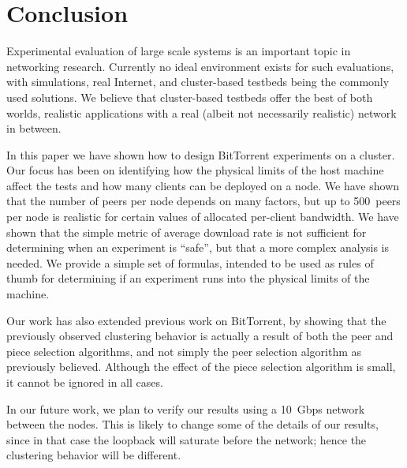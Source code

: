 \documentclass[10pt,letterpaper,twocolumn]{article}
\begin{document}
\section{Conclusion}
\label{conclusion}

Experimental evaluation of large scale systems is an important topic
in networking research. Currently no ideal environment exists for such
evaluations, with simulations, real Internet, and cluster-based
testbeds being the commonly used solutions. We believe that
cluster-based testbeds offer the best of both worlds, realistic
applications with a real (albeit not necessarily realistic) network in
between. 

In this paper we have shown how to design BitTorrent experiments on a
cluster. Our focus has been on identifying how the physical limits of
the host machine affect the tests and how many clients can be deployed
on a node. We have shown that the number of peers per node depends on
many factors, but up to 500~peers per node is realistic for certain
values of allocated per-client bandwidth. We have shown that the
simple metric of average download rate is not sufficient for
determining when an experiment is ``safe'', but that a more complex
analysis is needed. We provide a simple set of formulas, intended to
be used as rules of thumb for determining if an experiment runs into
the physical limits of the machine. 

Our work has also extended previous work on BitTorrent, by showing
that the previously observed clustering behavior is actually a result
of both the peer and piece selection algorithms, and not simply the
peer selection algorithm as previously believed. Although the effect
of the piece selection algorithm is small, it cannot be ignored in all
cases. 

In our future work, we plan to verify our results using a 10~Gbps
network between the nodes. This is likely to change some of the
details of our results, since in that case the loopback will saturate
before the network; hence the clustering behavior will be different. 















\end{document}
